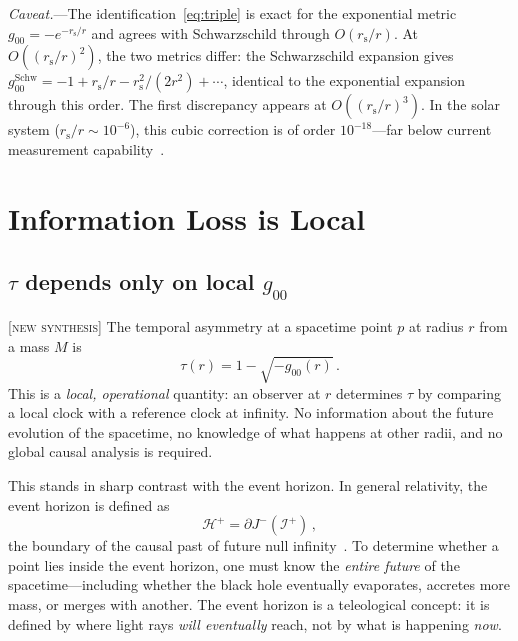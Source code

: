 \documentclass[prl,twocolumn,superscriptaddress,longbibliography,floatfix]{revtex4-2}
\newcommand{\tauasym}{\tau}
\newcommand{\rs}{r_{\mathrm{s}}}
\begin{document}
\emph{Caveat.}---The identification~\eqref{eq:triple} is exact
for the exponential metric
$g_{00} = -e^{-\rs/r}$ and agrees with Schwarzschild through
$O(\rs/r)$.
At $O((\rs/r)^2)$, the two metrics differ:
the Schwarzschild expansion gives
$g_{00}^{\text{Schw}} = -1 + \rs/r - \rs^2/(2r^2) + \cdots$,
identical to the exponential expansion through this order.
The first discrepancy appears at $O((\rs/r)^3)$.
In the solar system ($\rs/r \sim 10^{-6}$), this cubic
correction is of order $10^{-18}$---far below current
measurement capability~\cite{Bertotti2003}.

\section{Information Loss is Local}
\label{sec:locality}

\subsection{$\tauasym$ depends only on local $g_{00}$}
\label{sec:tau_local}

[\textsc{new synthesis}]
The temporal asymmetry at a spacetime point $p$
at radius $r$ from a mass $M$ is
\begin{equation}
  \tauasym(r) = 1 - \sqrt{-g_{00}(r)}\,.
  \label{eq:tau_local}
\end{equation}
This is a \emph{local, operational} quantity:
an observer at $r$ determines $\tauasym$ by comparing
a local clock with a reference clock at infinity.
No information about the future evolution of the
spacetime, no knowledge of what happens at other radii,
and no global causal analysis is required.

This stands in sharp contrast with the event horizon.
In general relativity, the event horizon is defined as
\begin{equation}
  \mathcal{H}^{+} = \partial J^{-}(\mathcal{I}^{+})\,,
  \label{eq:EH_def}
\end{equation}
the boundary of the causal past of future null
infinity~\cite{Hawking1973}.
To determine whether a point lies inside the event
horizon, one must know the \emph{entire future} of the
spacetime---including whether the black hole eventually
evaporates, accretes more mass, or merges with another.
The event horizon is a teleological concept:
it is defined by where light rays \emph{will eventually}
reach, not by what is happening \emph{now}.
\end{document}
